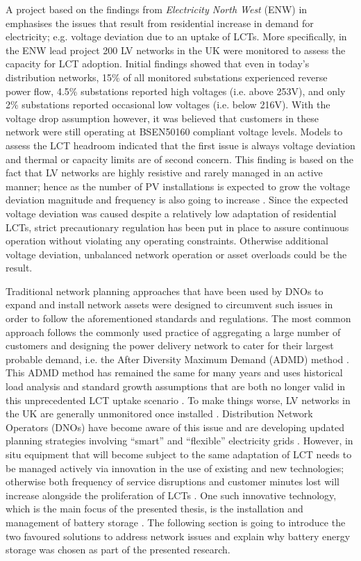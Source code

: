 A project based on the findings from \textit{Electricity North West} (ENW) in \cite{ElectricityNorthWestLtd2014} emphasises the issues that result from residential increase in demand for electricity; e.g. voltage deviation due to an uptake of LCTs.
More specifically, in the ENW lead project 200 LV networks in the UK were monitored to assess the capacity for LCT adoption.
Initial findings showed that even in today's distribution networks, 15\% of all monitored substations experienced reverse power flow, 4.5\% substations reported high voltages (i.e. above 253V), and only 2\% substations reported occasional low voltages (i.e. below 216V).
With the voltage drop assumption however, it was believed that customers in these network were still operating at BSEN50160 compliant voltage levels.
Models to assess the LCT headroom indicated that the first issue is always voltage deviation and thermal or capacity limits are of second concern.
This finding is based on the fact that LV networks are highly resistive and rarely managed in an active manner; hence as the number of PV installations is expected to grow the voltage deviation magnitude and frequency is also going to increase \cite{Woyte2006}.
Since the expected voltage deviation was caused despite a relatively low adaptation of residential LCTs, strict precautionary regulation has been put in place to assure continuous operation without violating any operating constraints.
Otherwise additional voltage deviation, unbalanced network operation or asset overloads could be the result.

Traditional network planning approaches that have been used by DNOs to expand and install network assets were designed to circumvent such issues in order to follow the aforementioned standards and regulations.
The most common approach follows the commonly used practice of aggregating a large number of customers and designing the power delivery network to cater for their largest probable demand, i.e. the After Diversity Maximum Demand (ADMD) method \cite{Richardson2010a}.
This ADMD method has remained the same for many years and uses historical load analysis and standard growth assumptions that are both no longer valid in this unprecedented LCT uptake scenario \cite{Yunusov2016}.
To make things worse, LV networks in the UK are generally unmonitored once installed \cite{Yunusov2016}.
Distribution Network Operators (DNOs) have become aware of this issue and are developing updated planning strategies involving ``smart'' and ``flexible'' electricity grids \cite{Fang2012}.
However, in situ equipment that will become subject to the same adaptation of LCT needs to be managed actively via innovation in the use of existing and new technologies; otherwise both frequency of service disruptions and customer minutes lost will increase alongside the proliferation of LCTs \cite{Ault2008a}.
One such innovative technology, which is the main focus of the presented thesis, is the installation and management of battery storage \cite{Chen2009}.
The following section is going to introduce the two favoured solutions to address network issues and explain why battery energy storage was chosen as part of the presented research.



